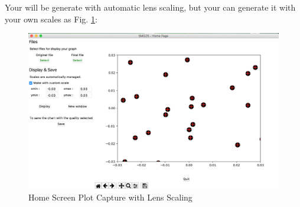 \documentclass[a4paper, 10 pt]{report}
\begin{document}
Your will be generate with automatic lens scaling, but your can generate it with your own scales as Fig. \ref{fig:Home Screen Plot Capture with lens scaling}:

\begin{figure}[htbp]
	\label{fig:Home Screen Plot Capture with lens scaling}
	\caption{Home Screen Plot Capture with Lens Scaling}
		\centering
	\includegraphics[width=12cm]{home_screen_custom.png}
\end{figure}


	\newpage
\end{document}
